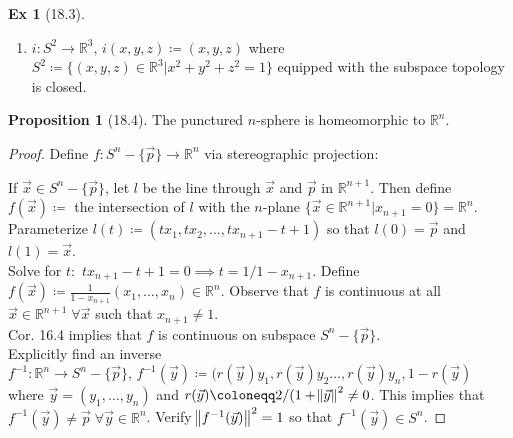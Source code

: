 \documentclass{article}
\newcommand{\R}{\ensuremath{\mathbb{R}}}
\newcommand{\coleq}{\ensuremath{\coloneqq}}
\newcommand{\func}[3]{\ensuremath{#1: #2 \to #3}}
\theoremstyle{definition}
\newtheorem*{prop}{Proposition}
\newtheorem*{ex}{Ex}
\theoremstyle{remark}
\begin{document}
{\begin{ex}[18.3]
\begin{enumerate}
                    \item $\func{i}{S^2}{\R^3}, \, i(x,y,z)\coleq(x,y,z)$ where $S^2\coleq\{(x,y,z) \in \R^3| x^2+y^2+z^2=1\}$ equipped with the subspace topology is closed.
                \end{enumerate}
            \end{ex}
        
            \begin{prop}[18.4]
                The punctured $n$-sphere is homeomorphic to $\R^n$.
            \end{prop}
            
            \begin{proof}
                Define $\func{f}{S^n-\{\Vec{p}\}}{\R^n}$ via stereographic projection:
                If $\Vec{x} \in S^n-\{\Vec{p}\}$, let $l$ be the line through $\Vec{x}$ and $\Vec{p}$ in $\R^{n+1}$. Then define $f(\Vec{x}) \coleq$ the intersection of $l$ with the $n$-plane $\{\Vec{x}\in \R^{n+1}|x_{n+1}=0\}=\R^n$. Parameterize $l(t)\coleq (tx_1,tx_2,\ldots,tx_{n+1}-t+1)$ so that $l(0)= \Vec{p}$ and $l(1)=\Vec{x}$.\\
                Solve for $t:$ $tx_{n+1}-t+1=0 \implies t=1/1-x_{n+1}$. Define $f(\Vec{x})\coleq \frac{1}{1-x_{n+1}}(x_1,\ldots,x_n) \in \R^n$. Observe that $f$ is continuous at all $\Vec{x} \in \R^{n+1} \; \forall \Vec{x}$ such that $x_{n+1} \neq 1$.\\
                Cor. 16.4 implies that $f$ is continuous on subspace $S^n-\{\Vec{p}\}$.\\
                Explicitly find an inverse $\func{f^{-1}}{\R^n}{S^n-\{\Vec{p}\}}, \, f^{-1}(\Vec{y})\coleq (r(\Vec{y})y_1,r(\Vec{y})y_2\ldots,r(\Vec{y})y_n, 1-r(\Vec{y})$ where $\Vec{y}=(y_1,\ldots,y_n)$ and $r(\Vec{y})\coleq 2/(1+\norm{\Vec{y}}^2 \neq 0$. This implies that $f^{-1}(\Vec{y})\neq \Vec{p} \; \forall \Vec{y} \in \R^n$. Verify $\norm{f^{-1}(\Vec{y})}^2=1$ so that $f^{-1}(\Vec{y}) \in S^n$.
            \end{proof}
        }
\end{document}
